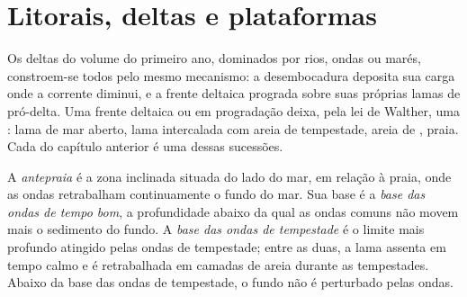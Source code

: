 \begin{omfigure}
\par{}\label{fig:b3:facies-models:rivers}
\end{omfigure}

\section{Litorais, deltas e plataformas}\label{sec:b3:facies-models:shelves}

Os deltas do volume do primeiro ano, dominados por rios, ondas ou marés, constroem-se todos
pelo mesmo mecanismo: a desembocadura deposita sua carga onde a corrente diminui, e a frente deltaica
prograda sobre suas próprias lamas de pró-delta. Uma
frente deltaica ou  em progradação deixa, pela lei de Walther, uma
: lama de mar aberto, lama intercalada com areia de
tempestade, areia de , praia. Cada  do capítulo anterior é uma
dessas sucessões.

\begin{definition}\label{def:b3:facies-models:shoreface}
A \emph{antepraia} é a zona inclinada situada do lado do mar, em relação à
praia, onde as ondas retrabalham continuamente o fundo do mar. Sua base é a
\emph{base das ondas de tempo bom}, a profundidade abaixo da
qual as ondas comuns não movem mais o sedimento do fundo. A \emph{base das ondas de
tempestade} é o limite mais profundo atingido pelas ondas de tempestade;
entre as duas, a lama assenta em tempo calmo e é retrabalhada em camadas de areia
durante as tempestades. Abaixo da base das ondas de tempestade, o fundo não é perturbado pelas ondas.
\end{definition}

